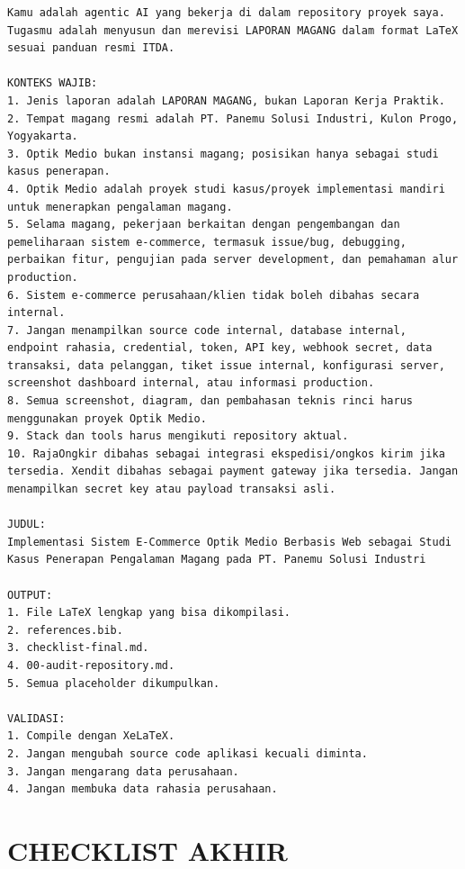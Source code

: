 \documentclass[12pt,a4paper]{report}
\begin{document}
\begin{lstlisting}[style=promptstyle]
Kamu adalah agentic AI yang bekerja di dalam repository proyek saya. Tugasmu adalah menyusun dan merevisi LAPORAN MAGANG dalam format LaTeX sesuai panduan resmi ITDA.

KONTEKS WAJIB:
1. Jenis laporan adalah LAPORAN MAGANG, bukan Laporan Kerja Praktik.
2. Tempat magang resmi adalah PT. Panemu Solusi Industri, Kulon Progo, Yogyakarta.
3. Optik Medio bukan instansi magang; posisikan hanya sebagai studi kasus penerapan.
4. Optik Medio adalah proyek studi kasus/proyek implementasi mandiri untuk menerapkan pengalaman magang.
5. Selama magang, pekerjaan berkaitan dengan pengembangan dan pemeliharaan sistem e-commerce, termasuk issue/bug, debugging, perbaikan fitur, pengujian pada server development, dan pemahaman alur production.
6. Sistem e-commerce perusahaan/klien tidak boleh dibahas secara internal.
7. Jangan menampilkan source code internal, database internal, endpoint rahasia, credential, token, API key, webhook secret, data transaksi, data pelanggan, tiket issue internal, konfigurasi server, screenshot dashboard internal, atau informasi production.
8. Semua screenshot, diagram, dan pembahasan teknis rinci harus menggunakan proyek Optik Medio.
9. Stack dan tools harus mengikuti repository aktual.
10. RajaOngkir dibahas sebagai integrasi ekspedisi/ongkos kirim jika tersedia. Xendit dibahas sebagai payment gateway jika tersedia. Jangan menampilkan secret key atau payload transaksi asli.

JUDUL:
Implementasi Sistem E-Commerce Optik Medio Berbasis Web sebagai Studi Kasus Penerapan Pengalaman Magang pada PT. Panemu Solusi Industri

OUTPUT:
1. File LaTeX lengkap yang bisa dikompilasi.
2. references.bib.
3. checklist-final.md.
4. 00-audit-repository.md.
5. Semua placeholder dikumpulkan.

VALIDASI:
1. Compile dengan XeLaTeX.
2. Jangan mengubah source code aplikasi kecuali diminta.
3. Jangan mengarang data perusahaan.
4. Jangan membuka data rahasia perusahaan.
\end{lstlisting}

\chapter{CHECKLIST AKHIR}
\end{document}
